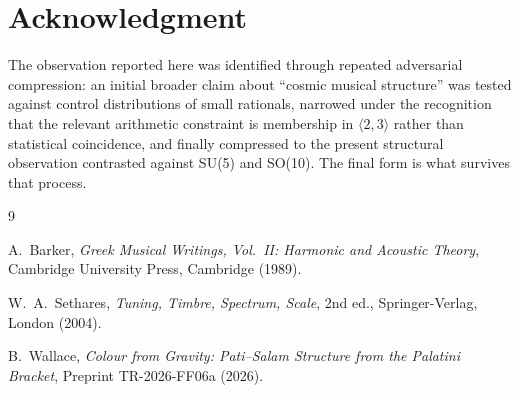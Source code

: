 \documentclass[11pt]{article}
\theoremstyle{plain}
\theoremstyle{remark}
\begin{document}
\section*{Acknowledgment}

The observation reported here was identified through repeated
adversarial compression: an initial broader claim about ``cosmic
musical structure'' was tested against control distributions of
small rationals, narrowed under the recognition that the relevant
arithmetic constraint is membership in $\langle 2, 3 \rangle$ rather
than statistical coincidence, and finally compressed to the present
structural observation contrasted against SU(5) and SO(10).  The
final form is what survives that process.

\begin{thebibliography}{9}

A.~Barker,
\textit{Greek Musical Writings, Vol.~II: Harmonic and Acoustic Theory},
Cambridge University Press, Cambridge (1989).

W.~A.~Sethares,
\textit{Tuning, Timbre, Spectrum, Scale}, 2nd ed.,
Springer-Verlag, London (2004).

B.~Wallace,
\textit{Colour from Gravity: Pati--Salam Structure from the Palatini
Bracket},
Preprint TR-2026-FF06a (2026).

\end{thebibliography}
\end{document}
